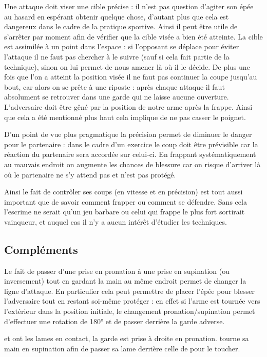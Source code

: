 Une attaque doit viser une cible précise : il n'est pas question d'agiter son épée au hasard en espérant obtenir quelque chose, d'autant plus que cela est dangereux dans le cadre de la pratique sportive.
Ainsi il peut être utile de s'arrêter par moment afin de vérifier que la cible visée a bien été atteinte.
La cible est assimilée à un point dans l'espace : si l'opposant se déplace pour éviter l'attaque il ne faut pas chercher à le suivre (sauf si cela fait partie de la technique), sinon on lui permet de nous amener là où il le décide.
De plus une fois que l'on a atteint la position visée il ne faut pas continuer la coupe jusqu'au bout, car alors on se prête à une riposte : après chaque attaque il faut absolument se retrouver dans une garde qui ne laisse aucune ouverture.
L'adversaire doit être gêné par la position de notre arme après la frappe.
Ainsi que cela a été mentionné plus haut cela implique de ne pas casser le poignet.

D'un point de vue plus pragmatique la précision permet de diminuer le danger pour le partenaire : dans le cadre d'un exercice le coup doit être prévisible car la réaction du partenaire sera accordée sur celui-ci.
En frappant systématiquement au mauvais endroit on augmente les chances de blessure car on risque d'arriver là où le partenaire ne s'y attend pas et n'est pas protégé.

Ainsi le fait de contrôler ses coups (en vitesse et en précision) est tout aussi important que de savoir comment frapper ou comment se défendre.
Sans cela l'escrime ne serait qu'un jeu barbare ou celui qui frappe le plus fort sortirait vainqueur, et auquel cas il n'y a aucun intérêt d'étudier les techniques.


\subsection{Compléments}


Le fait de passer d'une prise en pronation à une prise en supination (ou inversement) tout en gardant la main au même endroit permet de changer la ligne d'attaque.
En particulier cela peut permettre de placer l'épée pour blesser l'adversaire tout en restant soi-même protéger : en effet si l'arme est tournée vers l'extérieur dans la position initiale, le changement pronation/supination permet d'effectuer une rotation de \ang{180} et de passer derrière la garde adverse.


\begin{technique}
\label{struct:tech:changement-ligne}

\A et \D ont les lames en contact, la garde est prise à droite en pronation.
\A tourne sa main en supination afin de passer sa lame derrière celle de \D pour le toucher.

\end{technique}


